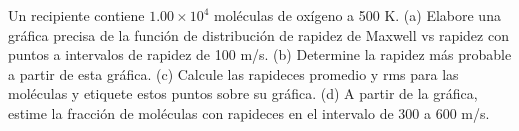 \item Un recipiente contiene $1.00 \times 10^4$ moléculas de oxígeno a 500 K. 
(a) Elabore una gráfica precisa de la función de distribución de rapidez de Maxwell vs rapidez con puntos a intervalos de rapidez de 100 m/s. 
(b) Determine la rapidez más probable a partir de esta gráfica. 
(c) Calcule las rapideces promedio y rms para las moléculas y etiquete estos puntos sobre su gráfica. 
(d) A partir de la gráfica, estime la fracción de moléculas con rapideces en el intervalo de 300 a 600 m/s.
